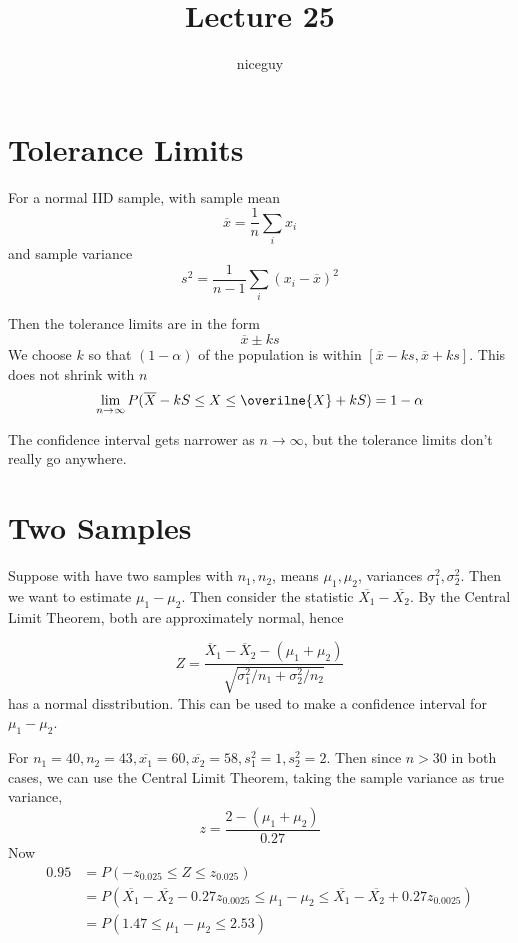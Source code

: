 \documentclass[12pt]{article}
\author{niceguy}
\title{Lecture 25}
\begin{document}
\maketitle

\section{Tolerance Limits}
For a normal IID sample, with sample mean
$$\overline{x} = \frac{1}{n}\sum_ix_i$$
and sample variance
$$s^2 = \frac{1}{n-1} \sum_i (x_i-\overline{x})^2$$

Then the tolerance limits are in the form
$$\overline{x} \pm ks$$
We choose $k$ so that $(1-\alpha)$ of the population is within $[\overline{x}-ks,\overline{x}+ks]$. This does not shrink with $n$
$$\lim_{n\rightarrow\infty}P(\overline{X}-kS \leq X \leq \overilne{X}+kS) = 1 - \alpha$$

\begin{ex}[Heights]
	The confidence interval gets narrower as $n \rightarrow \infty$, but the tolerance limits don't really go anywhere.
\end{ex}

\section{Two Samples}

Suppose with have two samples with $n_1,n_2$, means $\mu_1,\mu_2$, variances $\sigma_1^2,\sigma_2^2$. Then we want to estimate $\mu_1-\mu_2$. Then consider the statistic $\overline{X_1}-\overline{X_2}$. By the Central Limit Theorem, both are approximately normal, hence

$$Z = \frac{\overline{X}_1 - \overline{X}_2 - (\mu_1 + \mu_2)}{\sqrt{\sigma_1^2/n_1 + \sigma_2^2 / n_2}}$$
has a normal disstribution. This can be used to make a confidence interval for $\mu_1-\mu_2$.

\begin{ex}[Swimmers]
	For $n_1=40,n_2=43, \overline{x_1}=60,\overline{x_2}=58, s_1^2=1,s_2^2=2$. Then since $n>30$ in both cases, we can use the Central Limit Theorem, taking the sample variance as true variance,
	$$z = \frac{2-(\mu_1+\mu_2)}{0.27}$$
	Now
	\begin{align*}
		0.95 &= P(-z_{0.025} \leq Z \leq z_{0.025}) \\
		     &= P(\overline{X_1} - \overline{X_2} - 0.27z_{0.0025} \leq \mu_1 - \mu_2 \leq \overline{X_1} - \overline{X_2} + 0.27z_{0.0025}) \\
		     &= P(1.47 \leq \mu_1 - \mu_2 \leq 2.53)
	\end{align*}
\end{ex}
\end{document}
